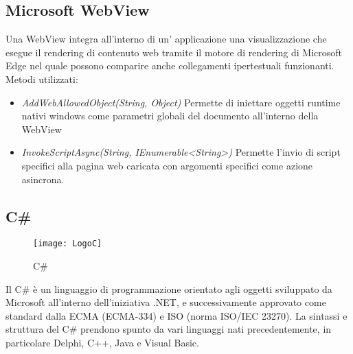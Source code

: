 \subsection{Microsoft WebView}
Una WebView\cite{webview} integra all'interno di un' applicazione una visualizzazione che esegue il rendering di contenuto web tramite il motore di rendering di Microsoft Edge nel quale possono comparire anche collegamenti ipertestuali funzionanti.
Metodi utilizzati:
\begin{itemize}
\item \emph{AddWebAllowedObject(String, Object)}\cite{awao} Permette di iniettare oggetti runtime nativi windows come parametri globali del documento all'interno della WebView
\item \emph{InvokeScriptAsync(String, IEnumerable<String>)}\cite{isa} Permette l'invio di script specifici alla pagina web caricata con argomenti specifici come azione asincrona. 
\end{itemize}

\subsection{C\#}
\begin{figure}[htpb!]
\center
  \texttt{[image: LogoC]}
  \caption{C\#}
\end{figure}
Il C\#\cite{cs} è un linguaggio di programmazione orientato agli oggetti sviluppato da Microsoft all'interno dell'iniziativa .NET, e successivamente approvato come standard dalla ECMA (ECMA-334) e ISO (norma ISO/IEC 23270).
La sintassi e struttura del C\# prendono spunto da vari linguaggi nati precedentemente, in particolare Delphi, C++, Java e Visual Basic.
